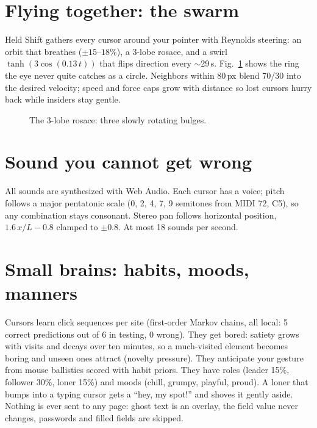 \documentclass[10pt,conference]{IEEEtran}
\begin{document}
\section{Flying together: the swarm}
Held Shift gathers every cursor around your pointer with Reynolds steering:
an orbit that breathes ($\pm15$--$18\%$), a 3-lobe rosace, and a swirl
$\tanh(3\cos(0.13\,t))$ that flips direction every $\sim$29\,s.
Fig.~\ref{fig:rosace} shows the ring the eye never quite catches as a circle.
Neighbors within 80\,px blend 70/30 into the desired velocity; speed and force
caps grow with distance so lost cursors hurry back while insiders stay gentle.

\begin{figure}[h]
\centering
{}
\caption{The 3-lobe rosace: three slowly rotating bulges.}
\label{fig:rosace}
\end{figure}

\section{Sound you cannot get wrong}
All sounds are synthesized with Web Audio. Each cursor has a voice; pitch
follows a major pentatonic scale (0, 2, 4, 7, 9 semitones from MIDI 72, C5),
so any combination stays consonant. Stereo pan follows horizontal position,
$1.6\,x/L - 0.8$ clamped to $\pm0.8$. At most 18 sounds per second.

\section{Small brains: habits, moods, manners}
Cursors learn click sequences per site (first-order Markov chains, all
local: 5 correct predictions out of 6 in testing, 0 wrong). They get bored:
satiety grows with visits and decays over ten minutes, so a much-visited
element becomes boring and unseen ones attract (novelty pressure). They
anticipate your gesture from mouse ballistics scored with habit priors. They
have roles (leader 15\%, follower 30\%, loner 15\%) and moods (chill, grumpy,
playful, proud). A loner that bumps into a typing cursor gets a ``hey, my
spot!'' and shoves it gently aside. Nothing is ever sent to any page: ghost
text is an overlay, the field value never changes, passwords and filled
fields are skipped.
\end{document}
